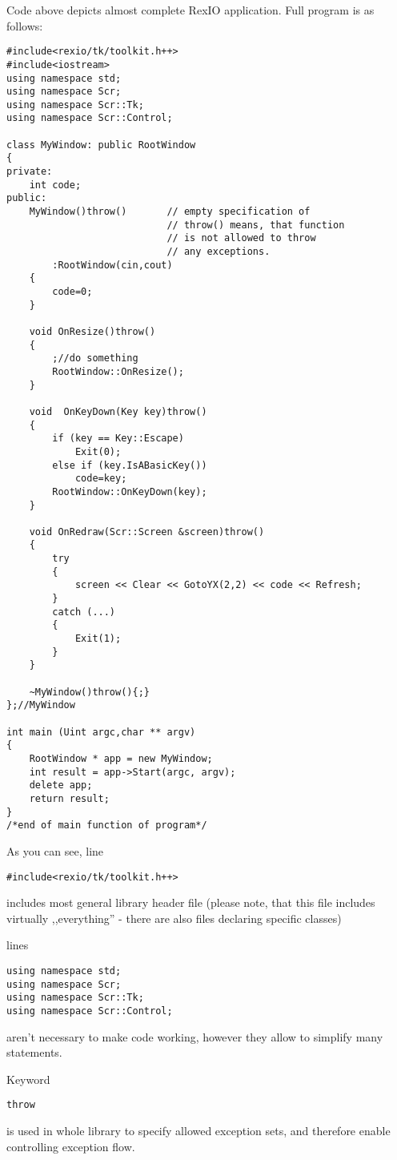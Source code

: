 Code above depicts almost complete RexIO application. Full program is as follows:
\fullcode
\begin{lstlisting}
#include<rexio/tk/toolkit.h++>
#include<iostream>
using namespace std;
using namespace Scr;
using namespace Scr::Tk;
using namespace Scr::Control;

class MyWindow: public RootWindow
{
private:
	int code;
public:
	MyWindow()throw()  		// empty specification of
							// throw() means, that function
        					// is not allowed to throw
							// any exceptions.
		:RootWindow(cin,cout)
	{
		code=0;
	}

	void OnResize()throw()
	{
		;//do something
		RootWindow::OnResize();
	}

	void  OnKeyDown(Key key)throw()
	{
		if (key == Key::Escape)
			Exit(0);
		else if (key.IsABasicKey())
			code=key;
		RootWindow::OnKeyDown(key);
	}

	void OnRedraw(Scr::Screen &screen)throw()
	{
		try
		{
			screen << Clear << GotoYX(2,2) << code << Refresh;
		}
		catch (...)
		{
			Exit(1);
		}
	}
	
	~MyWindow()throw(){;}
};//MyWindow

int main (Uint argc,char ** argv)
{
	RootWindow * app = new MyWindow;	
	int result = app->Start(argc, argv);	
	delete app;
	return result;
}
/*end of main function of program*/ 
\end{lstlisting}

As you can see, line 
\vspace{-10pt}\begin{verbatim}
#include<rexio/tk/toolkit.h++>
\end{verbatim}
\vspace{-10pt}includes most general library header file (please note, that this file
includes virtually ,,everything'' - there are also files declaring specific
classes)

lines 
\vspace{-10pt}\begin{verbatim}
using namespace std;
using namespace Scr;
using namespace Scr::Tk;
using namespace Scr::Control;
\end{verbatim}
\vspace{-10pt}aren't necessary to make code working, however they allow to simplify
many statements.

Keyword
\vspace{-10pt}\begin{verbatim}
throw
\end{verbatim}
\vspace{-10pt}is used in whole library to specify allowed exception sets, and
therefore enable controlling exception flow. 

